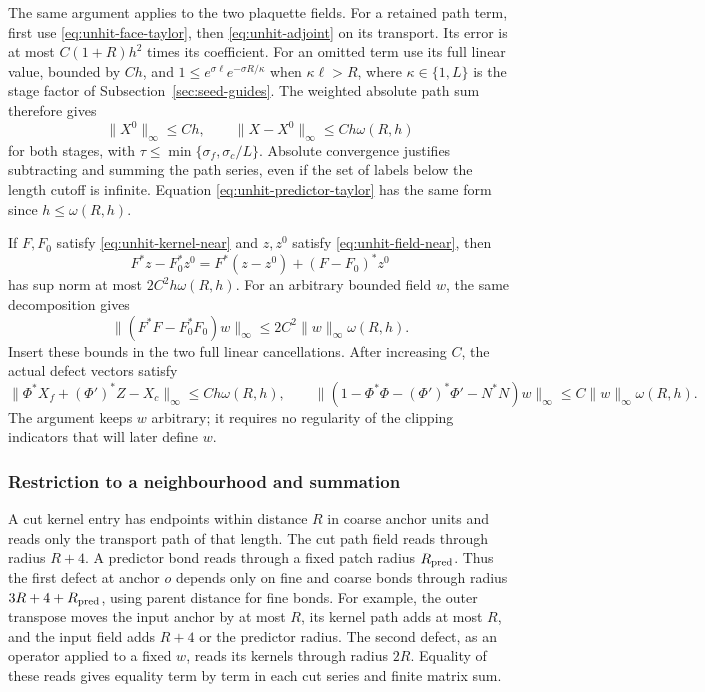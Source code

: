 The same argument applies to the two plaquette fields. For a retained
path term, first use \eqref{eq:unhit-face-taylor}, then
\eqref{eq:unhit-adjoint} on its transport. Its error is at most
$C(1+R)h^2$ times its coefficient. For an omitted term use its full
linear value, bounded by $Ch$, and
$1\le e^{\sigma\ell}e^{-\sigma R/\kappa}$ when $\kappa\ell>R$, where $\kappa\in\{1,L\}$
is the stage factor of Subsection~\ref{sec:seed-guides}.
The weighted absolute path sum therefore gives
\begin{equation}\label{eq:unhit-field-near}
 \|X^0\|_\infty\le Ch,\qquad
 \|X-X^0\|_\infty\le Ch\omega(R,h)
\end{equation}
for both stages, with $\tau\le\min\{\sigma_f,\sigma_c/L\}$.
Absolute convergence justifies subtracting and summing the path
series, even if the set of labels below the length cutoff is infinite.
Equation \eqref{eq:unhit-predictor-taylor} has the same form since
$h\le\omega(R,h)$.

If $F,F_0$ satisfy \eqref{eq:unhit-kernel-near} and
$z,z^0$ satisfy \eqref{eq:unhit-field-near}, then
\[
 F^*z-F_0^*z^0=F^*(z-z^0)+(F-F_0)^*z^0
\]
has sup norm at most $2C^2h\omega(R,h)$. For an arbitrary bounded
field $w$, the same decomposition gives
\[
 \|(F^*F-F_0^*F_0)w\|_\infty
       \le2C^2\|w\|_\infty\omega(R,h).
\]
Insert these bounds in the two full linear cancellations. After
increasing $C$, the actual defect vectors satisfy
\begin{equation}\label{eq:unhit-global}
 \|\Phi^*X_f+(\Phi')^*Z-X_c\|_\infty\le Ch\omega(R,h),
 \qquad
 \|(1-\Phi^*\Phi-(\Phi')^*\Phi'-N^*N)w\|_\infty
       \le C\|w\|_\infty\omega(R,h).
\end{equation}
The argument keeps $w$ arbitrary; it requires no regularity of the
clipping indicators that will later define $w$.

\subsubsection{Restriction to a neighbourhood and summation}
A cut kernel entry has endpoints within distance $R$ in coarse
anchor units and reads only the transport path of that length.
The cut path field reads through radius $R+4$. A predictor bond
reads through a fixed patch radius $R_{\rm pred}$. Thus the first
defect at anchor $o$ depends only on fine and coarse bonds through
radius $3R+4+R_{\rm pred}$, using parent distance for fine bonds.
For example, the outer transpose moves the input anchor by at most
$R$, its kernel path adds at most $R$, and the input field adds
$R+4$ or the predictor radius. The second defect, as an operator
applied to a fixed $w$, reads its kernels through radius $2R$.
Equality of these reads gives equality term by term in each cut
series and finite matrix sum.

